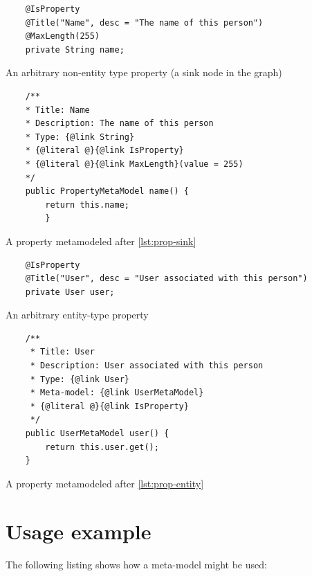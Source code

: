 \begin{listing}[H]
    \begin{verbatim}
    @IsProperty
    @Title("Name", desc = "The name of this person")
    @MaxLength(255)
    private String name;
    \end{verbatim}
    \caption{An arbitrary non-entity type property (a sink node in the graph)}
    \label{lst:prop-sink}
\end{listing}

\begin{listing}[H]
    \begin{verbatim}
    /**
    * Title: Name
    * Description: The name of this person
    * Type: {@link String}
    * {@literal @}{@link IsProperty}
    * {@literal @}{@link MaxLength}(value = 255)
    */
    public PropertyMetaModel name() {
        return this.name;
        }
    \end{verbatim}
    \caption{A property metamodeled after \ref{lst:prop-sink}}
    \label{lst:meta-prop-sink}
\end{listing}

\begin{listing}[H]
    \begin{verbatim}
    @IsProperty
    @Title("User", desc = "User associated with this person")
    private User user;
    \end{verbatim}
    \caption{An arbitrary entity-type property}
    \label{lst:prop-entity}
\end{listing}

\begin{listing}[H]
    \begin{verbatim}
    /**
     * Title: User
     * Description: User associated with this person
     * Type: {@link User}
     * Meta-model: {@link UserMetaModel}
     * {@literal @}{@link IsProperty}
     */
    public UserMetaModel user() {
        return this.user.get();
    }
    \end{verbatim}
    \caption{A property metamodeled after \ref{lst:prop-entity}}
    \label{lst:meta-prop-entity}
\end{listing}

\pagebreak
\section{Usage example}
The following listing shows how a meta-model might be used:


